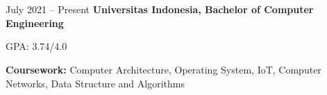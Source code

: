\documentclass[../main.tex]{subfiles}
\begin{document}
\section{}

\begin{twocolentry}{
    July 2021 – Present
}
    \textbf{Universitas Indonesia, Bachelor of Computer Engineering}
\end{twocolentry}

\vspace{0.10 cm}
\begin{onecolentry}
\begin{highlights}
    \item GPA: 3.74/4.0
    \item \textbf{Coursework:} Computer Architecture, Operating System, IoT, Computer Networks, Data Structure and Algorithms
\end{highlights}
\end{onecolentry}
\end{document}
